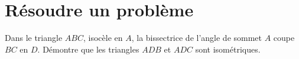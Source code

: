 \section*{Résoudre un problème}
\begin{exercise}[points=3]
    Dans le triangle $ABC$, isocèle en $A$, la bissectrice de l'angle de sommet $A$ coupe $BC$ en $D$. Démontre que les triangles $ADB$ et $ADC$ sont isométriques.\\
    \begin{center}
        
    \end{center}
\end{exercise}

